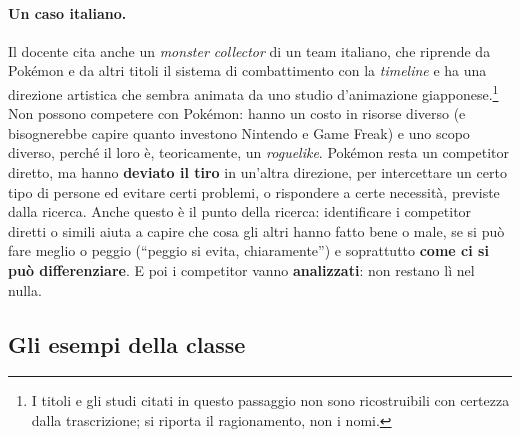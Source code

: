 \paragraph{Un caso italiano.} Il docente cita anche un \emph{monster
collector} di un team italiano, che riprende da Pokémon e da altri titoli il
sistema di combattimento con la \emph{timeline} e ha una direzione artistica
che sembra animata da uno studio d'animazione giapponese.\footnote{I titoli e
gli studi citati in questo passaggio non sono ricostruibili con certezza dalla
trascrizione; si riporta il ragionamento, non i nomi.} Non possono competere
con Pokémon: hanno un costo in risorse diverso (e bisognerebbe capire quanto
investono Nintendo e Game Freak) e uno scopo diverso, perché il loro è,
teoricamente, un \emph{roguelike}. Pokémon resta un competitor diretto, ma
hanno \textbf{deviato il tiro} in un'altra direzione, per intercettare un
certo tipo di persone ed evitare certi problemi, o rispondere a certe
necessità, previste dalla ricerca. Anche questo è il punto della ricerca:
identificare i competitor diretti o simili aiuta a capire che cosa gli altri
hanno fatto bene o male, se si può fare meglio o peggio (``peggio si evita,
chiaramente'') e soprattutto \textbf{come ci si può differenziare}. E poi i
competitor vanno \textbf{analizzati}: non restano lì nel nulla.

\subsection{Gli esempi della classe}

